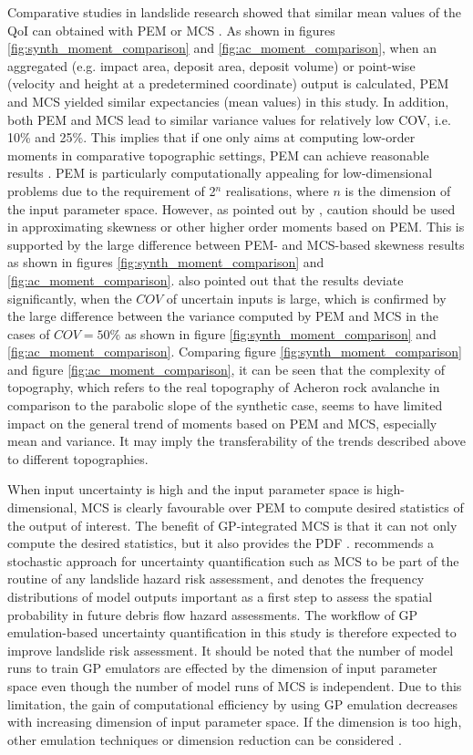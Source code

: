 \documentclass[utf8]{FrontiersinHarvard}
\begin{document}
Comparative studies in landslide research showed that similar mean values of the QoI can obtained with PEM or MCS \citep{Przewlocki2019,Tsai2015}. As shown in figures \ref{fig:synth_moment_comparison} and \ref{fig:ac_moment_comparison}, when an aggregated (e.g. impact area, deposit area, deposit volume) or point-wise (velocity and height at a predetermined coordinate) output is calculated, PEM and MCS yielded similar expectancies (mean values) in this study. In addition, both PEM and MCS lead to similar variance values for relatively low COV, i.e. 10\% and 25\%. This implies that if one only aims at computing low-order moments in comparative topographic settings, PEM can achieve reasonable results \citep{Fanelli2018}. PEM is particularly computationally appealing for low-dimensional problems due to the requirement of 2$^n$ realisations, where $n$ is the dimension of the input parameter space. However, as pointed out by \citet{Christian2002}, caution should be used in approximating skewness or other higher order moments based on PEM. This is supported by the large difference between PEM- and MCS-based skewness results as shown in figures \ref{fig:synth_moment_comparison} and \ref{fig:ac_moment_comparison}. \citet{Christian2002} also pointed out that the results deviate significantly, when the $COV$ of uncertain inputs is large, which is confirmed by the large difference between the variance computed by PEM and MCS in the cases of $COV=50\%$ as shown in figure \ref{fig:synth_moment_comparison} and \ref{fig:ac_moment_comparison}. Comparing figure \ref{fig:synth_moment_comparison} and figure \ref{fig:ac_moment_comparison}, it can be seen that the complexity of topography, which refers to the real topography of Acheron rock avalanche in comparison to the parabolic slope of the synthetic case, seems to have limited impact on the general trend of moments based on PEM and MCS, especially mean and variance. It may imply the transferability of the trends described above to different topographies.

When input uncertainty is high and the input parameter space is high-dimensional, MCS is clearly favourable over PEM to compute desired statistics of the output of interest. The benefit of GP-integrated MCS is that it can not only compute the desired statistics, but it also provides the PDF \citep{Marin2020}. \citet{Cepeda2013} recommends a stochastic approach for uncertainty quantification such as MCS to be part of the routine of any landslide hazard risk assessment, and \citet{Hussin2012} denotes the frequency distributions of model outputs important as a first step to assess the spatial probability in future debris flow hazard assessments. The workflow of GP emulation-based uncertainty quantification in this study is therefore expected to improve landslide risk assessment. It should be noted that the number of model runs to train GP emulators are effected by the dimension of input parameter space even though the number of model runs of MCS is independent. Due to this limitation, the gain of computational efficiency by using GP emulation decreases with increasing dimension of input parameter space. If the dimension is too high, other emulation techniques or dimension reduction can be considered \citep{Liu2017}.
\end{document}
